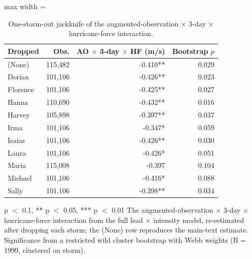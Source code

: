 \begin{table}

\caption{One-storm-out jackknife of the augmented-observation $\times$ 3-day $\times$ hurricane-force interaction. \label{tab:precision_jackknife_maria}}
\centering
\begin{adjustbox}{max width = \textwidth}
\begin{threeparttable}
\begin{tabular}[t]{lrrr}
\toprule
Dropped & Obs. & AO $\times$ 3-day $\times$ HF (m/s) & Bootstrap $p$\\
\midrule
(None) & 115,482 & -0.410** & 0.029\\
Dorian & 101,106 & -0.426** & 0.023\\
Florence & 101,106 & -0.425** & 0.027\\
Hanna & 110,690 & -0.432** & 0.016\\
Harvey & 105,898 & -0.397** & 0.037\\
Irma & 101,106 & -0.347* & 0.059\\
Isaias & 101,106 & -0.426** & 0.030\\
Laura & 101,106 & -0.426* & 0.051\\
Maria & 115,008 & -0.397 & 0.104\\
Michael & 101,106 & -0.416* & 0.088\\
Sally & 101,106 & -0.398** & 0.034\\
\bottomrule
\end{tabular}
\begin{tablenotes}
\small
\item * p $<$ 0.1, ** p $<$ 0.05, *** p $<$ 0.01 The augmented-observation $\times$ 3-day $\times$ hurricane-force interaction from the full lead $\times$ intensity model, re-estimated after dropping each storm; the (None) row reproduces the main-text estimate. Significance from a restricted wild cluster bootstrap with Webb weights (B = 1999, clustered on storm).
\end{tablenotes}
\end{threeparttable}
\end{adjustbox}
\end{table}

